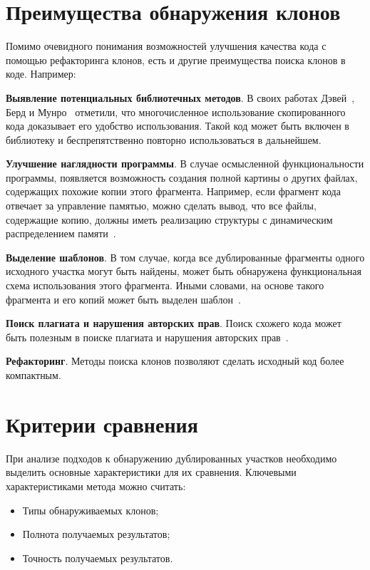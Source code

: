 \section{Преимущества обнаружения клонов}

Помимо очевидного понимания возможностей улучшения качества кода с помощью рефакторинга клонов, есть и другие преимущества поиска клонов в коде. Например: 

\textbf{Выявление потенциальных библиотечных методов}. В своих работах Дэвей~\cite{davey}, Берд и Мунро~\cite{burdmunro} отметили, что многочисленное использование скопированного кода доказывает его удобство использования. Такой код может быть включен в библиотеку и беспрепятственно повторно использоваться в дальнейшем.

\textbf{Улучшение наглядности программы}. В случае осмысленной функциональности программы, появляется возможность создания полной картины о других файлах, содержащих похожие копии этого фрагмента. Например, если фрагмент кода отвечает за управление памятью, можно сделать вывод, что все файлы, содержащие копию, должны иметь реализацию структуры с динамическим распределением памяти~\cite{memex}.

\textbf{Выделение шаблонов}. В том случае, когда все дублированные фрагменты одного исходного участка могут быть найдены, может быть обнаружена функциональная схема использования этого фрагмента. Иными словами, на основе такого фрагмента и его копий может быть выделен шаблон~\cite{memex}.

\textbf{Поиск плагиата и нарушения авторских прав}. Поиск схожего кода может быть полезным в поиске плагиата и нарушения авторских прав~\cite{plagiat}.

\textbf{Рефакторинг}. Методы поиска клонов позволяют сделать исходный код более компактным.

\section{Критерии сравнения}
\label{section:compare}

При анализе подходов к обнаружению дублированных участков необходимо выделить основные характеристики для их сравнения. Ключевыми характеристиками метода можно считать:
\begin{itemize}
\setlength\itemsep{0mm}
\item Типы обнаруживаемых клонов;
\item Полнота получаемых результатов;
\item Точность получаемых результатов.
\end{itemize}

